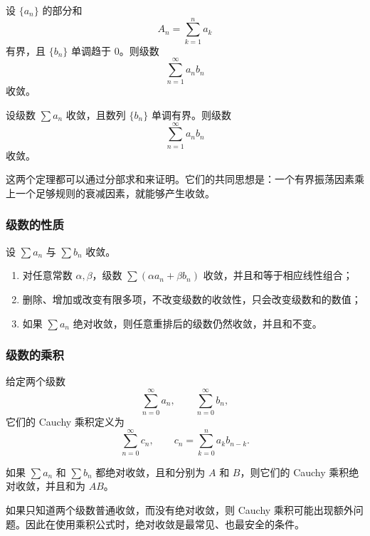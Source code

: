 \begin{theorem}
设 $\{a_n\}$ 的部分和
\[
    A_n=\sum_{k=1}^{n}a_k
\]
有界，且 $\{b_n\}$ 单调趋于 $0$。则级数
\[
    \sum_{n=1}^{\infty}a_nb_n
\]
收敛。
\end{theorem}

\begin{theorem}
设级数 $\sum a_n$ 收敛，且数列 $\{b_n\}$ 单调有界。则级数
\[
    \sum_{n=1}^{\infty}a_nb_n
\]
收敛。
\end{theorem}

这两个定理都可以通过分部求和来证明。它们的共同思想是：一个有界振荡因素乘上一个足够规则的衰减因素，就能够产生收敛。

\subsubsection{级数的性质}

\begin{property}
设 $\sum a_n$ 与 $\sum b_n$ 收敛。
\begin{enumerate}
    \item 对任意常数 $\alpha,\beta$，级数 $\sum(\alpha a_n+\beta b_n)$ 收敛，并且和等于相应线性组合；
    \item 删除、增加或改变有限多项，不改变级数的收敛性，只会改变级数和的数值；
    \item 如果 $\sum a_n$ 绝对收敛，则任意重排后的级数仍然收敛，并且和不变。
\end{enumerate}
\end{property}

\subsubsection{级数的乘积}

给定两个级数
\[
    \sum_{n=0}^{\infty}a_n,
    \qquad
    \sum_{n=0}^{\infty}b_n,
\]
它们的 Cauchy 乘积定义为
\[
    \sum_{n=0}^{\infty}c_n,
    \qquad
    c_n=\sum_{k=0}^{n}a_kb_{n-k}.
\]

\begin{theorem}[Cauchy 乘积]
如果 $\sum a_n$ 和 $\sum b_n$ 都绝对收敛，且和分别为 $A$ 和 $B$，则它们的 Cauchy 乘积绝对收敛，并且和为 $AB$。
\end{theorem}

\begin{remark}
如果只知道两个级数普通收敛，而没有绝对收敛，则 Cauchy 乘积可能出现额外问题。因此在使用乘积公式时，绝对收敛是最常见、也最安全的条件。
\end{remark}


